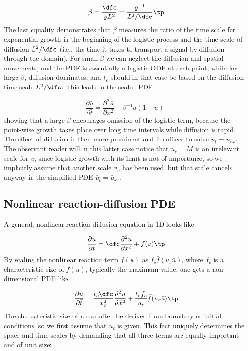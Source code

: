 \documentclass[graybox,envcountchap,sectrefs,final]{svmonodo}
\begin{document}
\[ \beta = \frac{\dfc}{\varrho L^2} = \frac{\varrho^{-1}}{L^2/\dfc}\tp\]
The last equality demonstrates
that $\beta$ measures the ratio of the time scale
for exponential growth in the beginning of the logistic process
and the time scale of diffusion $L^2/\dfc$ (i.e., the time it takes
to transport a signal by diffusion through the domain).
For small $\beta$ we can neglect the diffusion and spatial movements,
and the PDE is essentially a logistic ODE at each point, while for
large $\beta$, diffusion dominates, and $t_c$ should in that case be
based on the diffusion time scale $L^2/\dfc$. This leads to the
scaled PDE

\begin{equation}
\frac{\partial \bar u}{\partial \bar t} =
\frac{\partial^2 \bar u}{\partial x^2} + \beta^{-1}\bar u (1 - \bar u),
\end{equation}
showing that a large $\beta$ encourages omission of the logistic term,
because the point-wise growth takes place over long time intervals while
diffusion is rapid. The effect of diffusion is then more prominent
and it suffices to solve $\bar u_{\bar t} = \bar u_{\bar x\bar x}$.
The observant reader will in this latter case notice that $u_c=M$
is an irrelevant scale for $u$, since logistic growth with its limit is
not of importance, so we implicitly assume that another scale $u_c$
has been used, but that scale cancels anyway in the simplified PDE
$\bar u_{\bar t} = \bar u_{\bar x\bar x}$.


\subsection{Nonlinear reaction-diffusion PDE}

A general, nonlinear reaction-diffusion equation in 1D looks like

\begin{equation}
\frac{\partial u}{\partial t} = \dfc\frac{\partial^2 u}{\partial x^2} + f(u)
\tp
\end{equation}
By scaling the nonlinear reaction term $f(u)$ as $f_c\bar f(u_c\bar u)$,
where $f_c$ is a characteristic size of $f(u)$, typically the maximum
value, one gets a non-dimensional PDE like

\[
\frac{\partial\bar u}{\partial\bar t} = \frac{t_c\dfc}{x_c^2}
\frac{\partial^2\bar u}{\partial\bar x^2} +
\frac{t_cf_c}{u_c}\bar f(u_c\bar u)\tp
\]
The characteristic size of $u$ can often be derived from boundary or
initial conditions, so we first assume
that $u_c$ is given. This fact uniquely determines the space and time
scales by demanding that all three terms are equally important and
of unit size:
\end{document}
